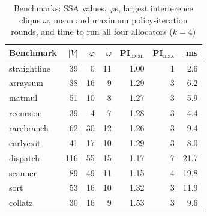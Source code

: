 \documentclass[conference]{IEEEtran}
\begin{document}
\begin{table}[t]
\centering
\caption{Benchmarks: SSA values, $\varphi$s, largest interference
clique $\omega$, mean and maximum policy-iteration rounds, and time
to run all four allocators ($k=4$)}
\label{tab:bench}
\footnotesize
\setlength{\tabcolsep}{3.5pt}
\begin{tabular}{@{}lrrrrrr@{}}
\toprule
Benchmark & $|V|$ & $\varphi$ & $\omega$ & PI$_{\text{mean}}$ & PI$_{\max}$ & ms \\
\midrule
straightline & 39 & 0 & 11 & 1.00 & 1 & 2.6 \\
arraysum & 38 & 16 & 9 & 1.29 & 3 & 6.2 \\
matmul & 51 & 10 & 8 & 1.27 & 3 & 5.9 \\
recursion & 39 & 4 & 7 & 1.28 & 3 & 4.4 \\
rarebranch & 62 & 30 & 12 & 1.26 & 3 & 9.4 \\
earlyexit & 41 & 17 & 10 & 1.29 & 3 & 8.0 \\
dispatch & 116 & 55 & 15 & 1.17 & 7 & 21.7 \\
scanner & 89 & 49 & 11 & 1.15 & 4 & 19.8 \\
sort & 53 & 16 & 10 & 1.32 & 3 & 11.9 \\
collatz & 30 & 16 & 9 & 1.53 & 3 & 9.6 \\
\bottomrule
\end{tabular}
\end{table}
\end{document}
